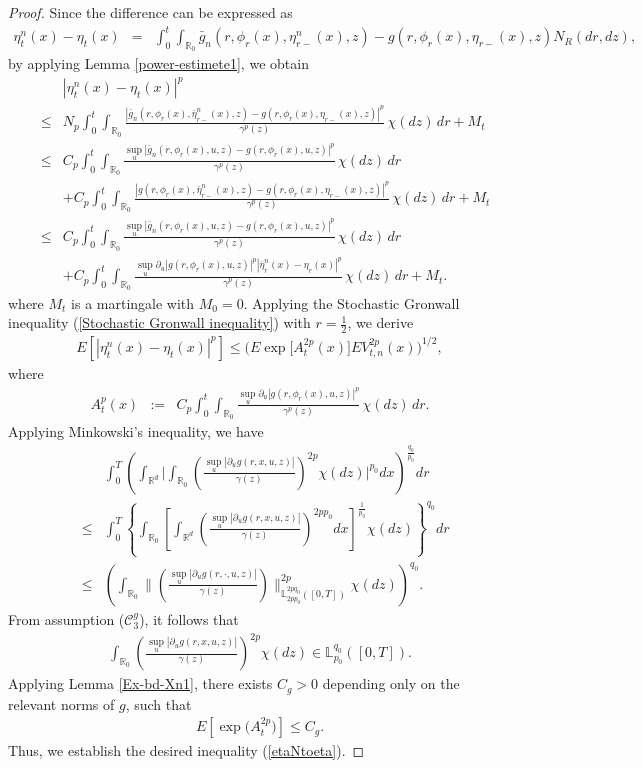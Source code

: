 \documentclass[12pt,oneside, reqno]{amsart}
\newcommand{\be}{\begin{eqnarray}}
\newcommand{\ee}{\end{eqnarray}}
\newcommand{\ce}{\begin{eqnarray*}}
\newcommand{\de}{\end{eqnarray*}}
\def\mL{{\mathbb L}}
\def\mR{{\mathbb R}}
\def\sC{{\mathscr C}}
\def\leq{\leqslant}
\numberwithin{equation}{section}
\begin{document}
\begin{proof}
	Since the difference can be expressed as
	\ce 
	\eta_t^n(x)-\eta_t(x)&=&\int_0^t\int_{\mR_0} \bar{g}_n(r,\phi_{r}(x),\eta_{r-}^n(x),z)-g(r,\phi_{r}(x),\eta_{r-}(x),z)N_R(dr,dz),
	\de 
by applying Lemma \ref{power-estimete1}, we obtain
	\ce 
	&&|\eta_t^n(x)-\eta_t(x)|^p\\
	&\leq& N_p\int_0^t\int_{\mR_0} \frac{|\bar{g}_n(r,\phi_{r}(x),\bar{\eta}_{r-}^n(x),z)-g(r,\phi_{r}(x),\eta_{r-}(x),z)|^p}{\gamma^p(z)}\,\chi(dz)\,dr+M_t\\
		&\leq&C_p\int_0^t\int_{\mR_0} \frac{\sup_u|\bar{g}_n(r,\phi_{r}(x),u,z)-g(r,\phi_{r}(x),u,z)|^p}{\gamma^p(z)}\,\chi(dz)\,dr\\
		&&+C_p\int_0^t\int_{\mR_0} \frac{|g(r,\phi_{r}(x),\bar{\eta}_{r-}^n(x),z)-g(r,\phi_{r}(x),\eta_{r-}(x),z)|^p}{\gamma^p(z)}\,\chi(dz)\,dr+M_t\\
		&\leq&C_p\int_0^t\int_{\mR_0} \frac{\sup_u|\bar{g}_n(r,\phi_{r}(x),u,z)-g(r,\phi_{r}(x),u,z)|^p}{\gamma^p(z)}\,\chi(dz)\,dr\\
		&&+C_p\int_0^t\int_{\mR_0} \frac{\sup_u\partial_u|g(r,\phi_{r}(x),u,z)|^p|\bar{\eta}_r^n(x)-\eta_r(x)|^p}{\gamma^p(z)}\,\chi(dz)\,dr+M_t.
	\de 
	where $M_t$ is a martingale with $M_0=0$. Applying the Stochastic Gronwall inequality (\ref{Stochastic Gronwall inequality})  with $r=\frac{1}{2}$, we derive
\ce 
E[|\eta_t^n(x)-\eta_t(x)|^{p}]\leq \big(E \exp\big[A_t^{2p}(x)\big]E V_{t,n}^{2p}(x)\big)^{1/2},
\de 
where 
\ce
 A_t^p(x)&:=&C_p\int_0^t\int_{\mR_0} \frac{\sup_u\partial_u|g(r,\phi_{r}(x),u,z)|^p}{\gamma^p(z)}\,\chi(dz)\,dr.
\de 
Applying Minkowski's inequality, we have 
\ce 
&&\int_0^T\left(\int_{\mR^d}\bigg|\int_{\mR_0}\left(\frac{\sup_u|\partial_u g(r,x,u,z)|}{\gamma(z)}\right)^{2p} \chi(dz)\bigg|^{p_0}dx\right)^{\frac{q_0}{p_0}}dr\\
&\leq &\int_0^T\left\{\int_{\mR_0}\left[\int_{\mR^d}\left(\frac{\sup_u|\partial_u g(r,x,u,z)|}{\gamma(z)}\right)^{2pp_0} dx\right]^{\frac{1}{p_0}}\chi(dz)\right\}^{q_0}dr\\
&\leq &\left(\int_{\mR_0}\big\|\left(\frac{\sup_u|\partial_u g(r,\cdot,u,z)|}{\gamma(z)}\right)\big\|_{\mL_{2pp_0}^{2pq_0}([0,T])}^{2p} \chi(dz)\right)^{q_0}.
\de 
From	assumption ($\sC_3^g$), it follows that
\be\label{basci-ineq-normal1+1}
\int_{\mR_0}\left(\frac{\sup_u|\partial_u g(r,x,u,z)|}{\gamma(z)}\right)^{2p}\chi(dz)\in \mL_{p_0}^{q_0}([0,T]).
\ee
Applying Lemma \ref{Ex-bd-Xn1}, there exists  $C_g>0$ depending only on the relevant norms of  $g$, such that 
\be\label{stochastical-G-ineq1+1} 
E[\exp\big(A_t^{2p}\big)]\leq C_g.
\ee 
Thus, we establish the desired inequality (\ref{etaNtoeta}).




\end{proof}
\end{document}
